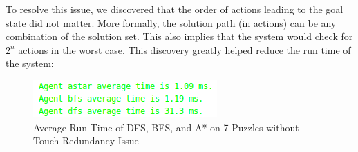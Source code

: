 To resolve this issue, we discovered that the order of actions leading to the goal state did not matter. More formally, the solution path (in actions) can be any combination of the solution set. This also implies that the system would check for $2^n$ actions in the worst case. This discovery greatly helped reduce the run time of the system:


\begin{figure}[H]
\includegraphics[width=0.75\linewidth]{assets/touch_redundancy_2.png}
\caption{Average Run Time of DFS, BFS, and A* on 7 Puzzles without Touch Redundancy Issue} \label{fig4}
\end{figure}